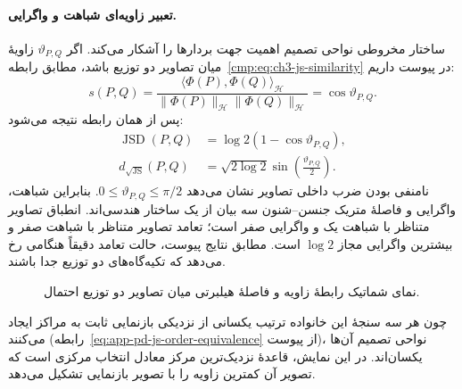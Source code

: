 \paragraph{تعبیر زاویه‌ای شباهت و واگرایی.}
ساختار مخروطی نواحی تصمیم اهمیت جهت بردارها
را آشکار می‌کند. اگر $\vartheta_{P,Q}$ زاویهٔ
میان تصاویر دو توزیع باشد، مطابق
رابطه~\eqref{cmp:eq:ch3-js-similarity} در پیوست
داریم:
\[
s(P,Q)=
\frac{\langle\Phi(P),\Phi(Q)\rangle_{\mathcal H}}
{\|\Phi(P)\|_{\mathcal H}\|\Phi(Q)\|_{\mathcal H}}
=\cos\vartheta_{P,Q}.
\]
پس از همان رابطه نتیجه می‌شود:
\begin{equation}\label{cmp:eq:ch3-js-angular-geometry}
\begin{aligned}
\operatorname{JSD}(P,Q)
&=\log2(1-\cos\vartheta_{P,Q}),\\
d_{\sqrt{\mathrm{JS}}}(P,Q)
&=\sqrt{2\log2}\sin\left(\frac{\vartheta_{P,Q}}{2}\right).
\end{aligned}
\end{equation}
نامنفی بودن ضرب داخلی تصاویر نشان می‌دهد
$0\le\vartheta_{P,Q}\le\pi/2$.
بنابراین شباهت، واگرایی و فاصلهٔ متریک
جنسن--شنون سه بیان از یک ساختار هندسی‌اند.
انطباق تصاویر متناظر با شباهت یک و واگرایی
صفر است؛ تعامد تصاویر متناظر با شباهت صفر
و بیشترین واگرایی مجاز $\log2$ است.
مطابق نتایج پیوست، حالت تعامد دقیقاً هنگامی
رخ می‌دهد که تکیه‌گاه‌های دو توزیع جدا باشند.

\begin{figure}[!htbp]
\centering
\begin{LTR}
\centering
{}
\end{LTR}
\caption{نمای شماتیک رابطهٔ زاویه و فاصلهٔ
هیلبرتی میان تصاویر دو توزیع احتمال.}
\label{cmp:fig:ch3-js-angular-geometry}
\end{figure}

چون هر سه سنجهٔ این خانواده ترتیب یکسانی
از نزدیکی بازنمایی ثابت به مراکز ایجاد
می‌کنند (رابطه~\eqref{eq:app-pd-js-order-equivalence}
از پیوست)، نواحی تصمیم آن‌ها یکسان‌اند.
در این نمایش، قاعدهٔ نزدیک‌ترین مرکز معادل
انتخاب مرکزی است که تصویر آن کمترین زاویه
را با تصویر بازنمایی تشکیل می‌دهد.

